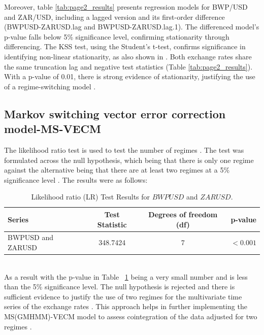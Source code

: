 \documentclass[a4paper]{article}
\theoremstyle{plain}
\theoremstyle{definition}
\theoremstyle{remark}
\begin{document}
Moreover, table \ref{tab:page2_results} presents regression models for BWP/USD and ZAR/USD, including a lagged version and its first-order difference (BWPUSD-ZARUSD.lag and BWPUSD-ZARUSD.lag.1). The differenced model’s p-value falls below 5\% significance level, confirming stationarity through differencing. The KSS test, using the Student’s t-test, confirms significance in identifying non-linear stationarity, as also shown in \cite{chang2015house,liu2010kss}. Both exchange rates share the same truncation lag and negative test statistics (Table \ref{tab:page2_results}). With a p-value of 0.01, there is strong evidence of stationarity, justifying the use of a regime-switching model \citep{makatjane2024forecasting}.

\subsection{Markov switching vector error correction model-MS-VECM}
The likelihood ratio test is used to test the number of regimes \citep{makatjane2024forecasting}. The test was formulated across the null hypothesis, which being that there is only one regime against the alternative being that there are at least two regimes at a 5\% significance level \citep{qu2021likelihood}. The results were as follows:
\begin{table}[ht]
\centering
\caption{Likelihood ratio (LR) Test Results for \( BWPUSD \) and \( ZARUSD \).}
\label{tab:LR test}
\vspace{0.5cm}
\begin{tabular}{lccc}
\hline
\textbf{Series} & \textbf{Test Statistic} & \textbf{Degrees of freedom (df)} & \textbf{p-value} \\
\hline
BWPUSD and ZARUSD & 348.7424 & 7 & $<0.001$  \\
\hline
\end{tabular}
\end{table}
\\
As a result with the p-value in Table ~\ref{tab:LR test} being a very small number and is less than the 5\% significance level.
The null hypothesis is rejected and there is sufficient evidence to justify the use of two regimes for the multivariate time series of the exchange rates \citep{makatjane2024forecasting}. This approach helps in further implementing the MS(GMHMM)-VECM model to assess cointegration of the data adjusted for two regimes \citep{phoong2013markov}.
\end{document}
